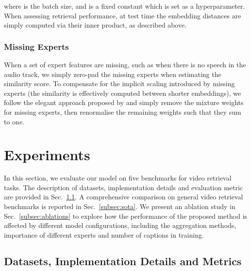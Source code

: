 \documentclass{bmvc2k}
\begin{document}
where  is the batch size, and  is a fixed constant which is set as a hyperparameter.  When assessing retrieval performance, at test time the embedding distances are simply computed via their inner product, as described above.

\subsubsection{Missing Experts} \label{subsec:missing-epxerts} When a set of expert features are missing, such as when there is no speech in the audio track, we simply zero-pad the missing experts when estimating the similarity score. To compensate for the implicit scaling introduced by missing experts (the similarity is effectively computed between shorter embeddings), we follow the elegant approach proposed by \cite{miech2018learning} and simply remove the mixture weights for missing experts, then renormalise the remaining weights such that they sum to one.    \section{Experiments}

In this section, we evaluate our model on five benchmarks for video retrieval tasks. The description of datasets, implementation details and evaluation metric are provided in Sec.~\ref{subsec:datsets}.  A comprehensive comparison on general video retrieval benchmarks is reported in Sec.~\ref{subsec:sota}.  We present an ablation study in Sec.~\ref{subsec:ablations} to explore how the performance of the proposed method is affected by different model configurations, including the aggregation methods, importance of different experts and number of captions in training.

\subsection{Datasets, Implementation Details and Metrics} \label{subsec:datsets}
\end{document}
